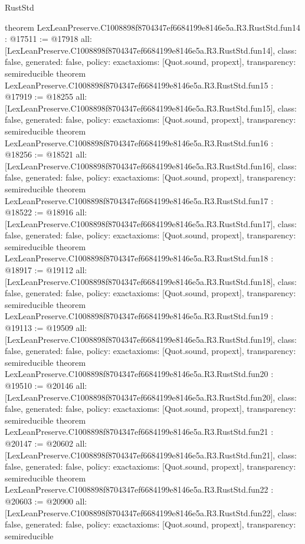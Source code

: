 \begin{lexlean}{RustStd}
\begin{coremodule}
{}
theorem LexLeanPreserve.C1008898f8704347ef6684199e8146e5a.R3.RustStd.fun14 : @17511 := @17918 {
  all: [LexLeanPreserve.C1008898f8704347ef6684199e8146e5a.R3.RustStd.fun14],
  class: false,
  generated: false,
  policy: exact{axioms: [Quot.sound, propext]},
  transparency: semireducible
}
theorem LexLeanPreserve.C1008898f8704347ef6684199e8146e5a.R3.RustStd.fun15 : @17919 := @18255 {
  all: [LexLeanPreserve.C1008898f8704347ef6684199e8146e5a.R3.RustStd.fun15],
  class: false,
  generated: false,
  policy: exact{axioms: [Quot.sound, propext]},
  transparency: semireducible
}
theorem LexLeanPreserve.C1008898f8704347ef6684199e8146e5a.R3.RustStd.fun16 : @18256 := @18521 {
  all: [LexLeanPreserve.C1008898f8704347ef6684199e8146e5a.R3.RustStd.fun16],
  class: false,
  generated: false,
  policy: exact{axioms: [Quot.sound, propext]},
  transparency: semireducible
}
theorem LexLeanPreserve.C1008898f8704347ef6684199e8146e5a.R3.RustStd.fun17 : @18522 := @18916 {
  all: [LexLeanPreserve.C1008898f8704347ef6684199e8146e5a.R3.RustStd.fun17],
  class: false,
  generated: false,
  policy: exact{axioms: [Quot.sound, propext]},
  transparency: semireducible
}
theorem LexLeanPreserve.C1008898f8704347ef6684199e8146e5a.R3.RustStd.fun18 : @18917 := @19112 {
  all: [LexLeanPreserve.C1008898f8704347ef6684199e8146e5a.R3.RustStd.fun18],
  class: false,
  generated: false,
  policy: exact{axioms: [Quot.sound, propext]},
  transparency: semireducible
}
theorem LexLeanPreserve.C1008898f8704347ef6684199e8146e5a.R3.RustStd.fun19 : @19113 := @19509 {
  all: [LexLeanPreserve.C1008898f8704347ef6684199e8146e5a.R3.RustStd.fun19],
  class: false,
  generated: false,
  policy: exact{axioms: [Quot.sound, propext]},
  transparency: semireducible
}
theorem LexLeanPreserve.C1008898f8704347ef6684199e8146e5a.R3.RustStd.fun20 : @19510 := @20146 {
  all: [LexLeanPreserve.C1008898f8704347ef6684199e8146e5a.R3.RustStd.fun20],
  class: false,
  generated: false,
  policy: exact{axioms: [Quot.sound, propext]},
  transparency: semireducible
}
theorem LexLeanPreserve.C1008898f8704347ef6684199e8146e5a.R3.RustStd.fun21 : @20147 := @20602 {
  all: [LexLeanPreserve.C1008898f8704347ef6684199e8146e5a.R3.RustStd.fun21],
  class: false,
  generated: false,
  policy: exact{axioms: [Quot.sound, propext]},
  transparency: semireducible
}
theorem LexLeanPreserve.C1008898f8704347ef6684199e8146e5a.R3.RustStd.fun22 : @20603 := @20900 {
  all: [LexLeanPreserve.C1008898f8704347ef6684199e8146e5a.R3.RustStd.fun22],
  class: false,
  generated: false,
  policy: exact{axioms: [Quot.sound, propext]},
  transparency: semireducible
}
\end{coremodule}
\end{lexlean}

